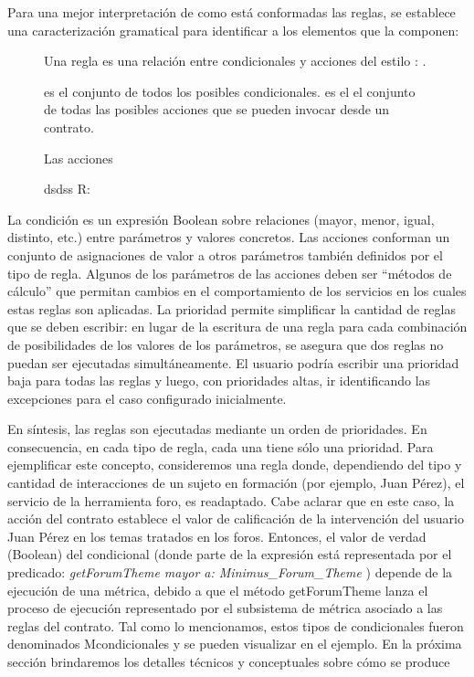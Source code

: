 Para una mejor interpretación de como está conformadas las reglas, se establece una caracterización gramatical para identificar a los elementos que la componen:

\begin{center}
 

\begin{figure}


Una regla es una relación entre condicionales y acciones del estilo \Re:  \rightarrow {}. 

 es el conjunto de todos los posibles condicionales. 
 es el el conjunto de todas las posibles acciones que se pueden  invocar desde un contrato. 

Las acciones 

dsdss
R:

\label{fig:representación_reglas}
\end{figure}


\end{center}


La condición es un expresión Boolean sobre relaciones (mayor, menor,
igual, distinto, etc.) entre parámetros y valores concretos.
Las acciones conforman un conjunto de asignaciones de valor a otros parámetros
también definidos por el tipo de regla. Algunos de los parámetros de
las acciones deben ser “métodos de cálculo” que permitan cambios en el comportamiento
de los servicios en los cuales estas reglas son aplicadas.
La prioridad permite simplificar la cantidad de reglas que se deben escribir:
en lugar de la escritura de una regla para cada combinación de posibilidades
de los valores de los parámetros, se asegura que dos reglas no puedan ser
ejecutadas simultáneamente. El usuario podría escribir una prioridad baja para
todas las reglas y luego, con prioridades altas, ir identificando las excepciones
para el caso configurado inicialmente.

En síntesis, las reglas son ejecutadas mediante un orden de prioridades. En
consecuencia, en cada tipo de regla, cada una tiene sólo una prioridad.
Para ejemplificar este concepto, consideremos una regla donde, dependiendo
del tipo y cantidad de interacciones de un sujeto en formación (por
ejemplo, Juan Pérez), el servicio de la herramienta foro, es readaptado. Cabe
aclarar que en este caso, la acción del contrato establece el valor de calificación
de la intervención del usuario Juan Pérez en los temas tratados en los
foros. Entonces, el valor de verdad (Boolean) del condicional (donde parte de
la expresión está representada por el predicado: \textit{getForumTheme mayor a:
Minimus\_Forum\_Theme} ) depende de la ejecución de una métrica, debido a
que el método getForumTheme lanza el proceso de ejecución representado por
el subsistema de métrica asociado a las reglas del contrato.
Tal como lo mencionamos, estos tipos de condicionales fueron denominados
Mcondicionales y se pueden visualizar en el ejemplo. En la próxima sección
brindaremos los detalles técnicos y conceptuales sobre cómo se produce

